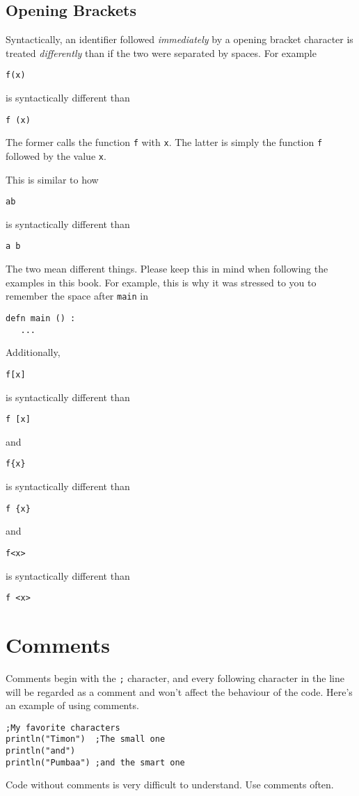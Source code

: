 \documentclass[10pt,oneside]{book}
\begin{document}
\subsection*{Opening Brackets}
Syntactically, an identifier followed {\em immediately} by a opening bracket character is treated {\em differently} than if the two were separated by spaces. For example
\begin{lstlisting}
f(x)
\end{lstlisting}
is syntactically different than
\begin{lstlisting}
f (x)
\end{lstlisting}
The former calls the function \texttt{\frenchspacing f} with \texttt{\frenchspacing x}. The latter is simply the function \texttt{\frenchspacing f} followed by the value \texttt{\frenchspacing x}.

This is similar to how
\begin{lstlisting}
ab
\end{lstlisting}
is syntactically different than
\begin{lstlisting}
a b
\end{lstlisting}
The two mean different things. Please keep this in mind when following the examples in this book. For example, this is why it was stressed to you to remember the space after \texttt{\frenchspacing main} in
\begin{lstlisting}
defn main () :
   ...
\end{lstlisting}

Additionally, 
\begin{lstlisting}
f[x]
\end{lstlisting}
is syntactically different than
\begin{lstlisting}
f [x]
\end{lstlisting}
and
\begin{lstlisting}
f{x}
\end{lstlisting}
is syntactically different than
\begin{lstlisting}
f {x}
\end{lstlisting}
and
\begin{lstlisting}
f<x>
\end{lstlisting}
is syntactically different than
\begin{lstlisting}
f <x>
\end{lstlisting}



\section{Comments}
Comments begin with the \texttt{\frenchspacing ;} character, and every following character in the line will be regarded as a comment and won't affect the behaviour of the code. Here's an example of using comments.
\begin{lstlisting}
;My favorite characters
println("Timon")  ;The small one
println("and")
println("Pumbaa") ;and the smart one
\end{lstlisting}
Code without comments is very difficult to understand. Use comments often.
\end{document}
